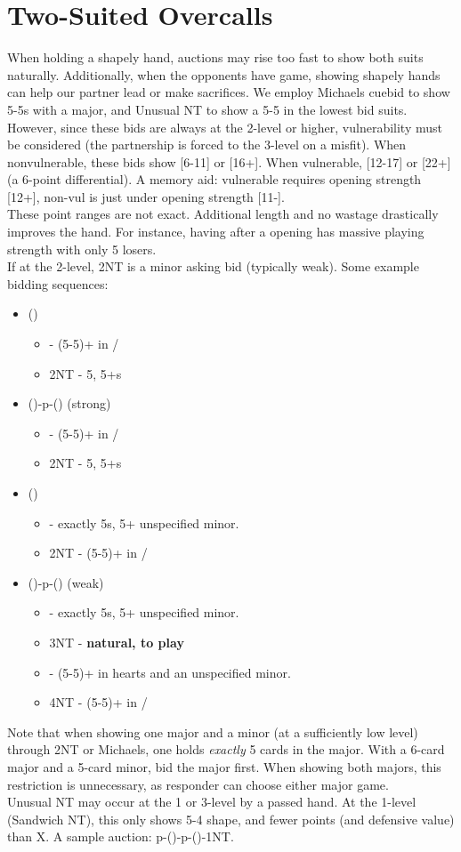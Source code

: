 \documentclass[12pt]{report}
\newcommand{\n}{\\}
\newcommand{\ul}[1]{\begin{itemize}#1\end{itemize}}
\newcommand{\li}{\item[~]}
\begin{document}
\section{Two-Suited Overcalls} \label{4:6}

    When holding a shapely hand, auctions may rise too fast to show both suits naturally.  Additionally, when the opponents have game, showing shapely hands can help our partner lead or make sacrifices.  We employ Michaels cuebid to show 5-5s with a major, and Unusual NT to show a 5-5 in the lowest bid suits. \n

    However, since these bids are always at the 2-level or higher, vulnerability must be considered (the partnership is forced to the 3-level on a misfit).  When nonvulnerable, these bids show [6-11] or [16+].  When vulnerable, [12-17] or [22+] (a 6-point differential).  A memory aid: vulnerable requires opening strength [12+], non-vul is just under opening strength [11-]. \n
    
    These point ranges are not exact.  Additional length and no wastage drastically improves the hand.  For instance, having   \di{}  after a  opening has massive playing strength with only 5 losers.\n
    
    If at the 2-level, 2NT is a minor asking bid (typically weak).  Some example bidding sequences:

    \ul {
        \li ()
        \ul {
            \li {} - (5-5)+ in \he{}/\sp{}
            \li 2NT - 5\he{}, 5+\di{}s
        }
        \li (\di1)-p-(\di2) (strong)
        \ul {
            \li \di3 - (5-5)+ in \he{}/\sp{}
            \li 2NT - 5\he{}, 5+\cl{}s
        }
        \li (\he1)
        \ul {
            \li \sp2 - exactly 5\sp{}s, 5+ unspecified minor.
            \li 2NT - (5-5)+ in \cl{}/\di{}
        }
        \li (\sp1)-p-(\sp3) (weak)
        \ul {
            \li \sp2 - exactly 5\he{}s, 5+ unspecified minor.
            \li 3NT - \textbf{natural, to play}
            \li \sp4 - (5-5)+ in hearts and an unspecified minor.
            \li 4NT - (5-5)+ in \cl{}/\di{}
        }
    }

    Note that when showing one major and a minor (at a sufficiently low level) through 2NT or Michaels, one holds \textit{exactly} 5 cards in the major.  With a 6-card major and a 5-card minor, bid the major first.  When showing both majors, this restriction is unnecessary, as responder can choose either major game. \n

    Unusual NT may occur at the 1 or 3-level by a passed hand.  At the 1-level (Sandwich NT), this only shows 5-4 shape, and fewer points (and defensive value) than X.  A sample auction: p-()-p-()-1NT.
\end{document}
